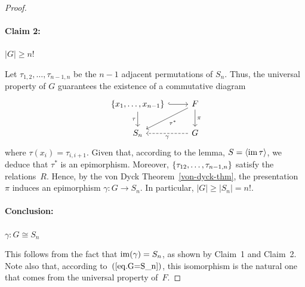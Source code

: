 \begin{proof}
\paragraph{Claim 2:}$|G|\ge n!$

Let $\tau_{1,2},\dots,\tau_{n-1,n}$ be the $n-1$ adjacent permutations of $S_n$. Thus, the universal property of $G$ guarantees the existence of a commutative diagram
\begin{equation}\label{eq.G=S_n}
    \begin{tikzcd}
        {\set{x_1,\dots,x_{n-1}}}
                \arrow[d,"\tau"']
                \arrow[r,hook]
            &F
                \arrow[ld,"\tau^*"]
                \arrow[d,"\pi"]\\
        S_n
            &G
                \arrow[l,dashed,"\gamma"]
    \end{tikzcd}
\end{equation}
where $\tau(x_i)=\tau_{i,i+1}$. Given that, according to the lemma, $S=\langle\operatorname{im}\tau\rangle$, we deduce that $\tau^*$ is an epimorphism. Moreover, $\{\tau_{12},\dots,\tau_{n-1,n}\}$ satisfy the relations~$R$. Hence, by the von Dyck Theorem~\ref{von-dyck-thm}, the presentation $\pi$ induces an epimorphism $\gamma\colon G\to S_n$. In particular, $|G|\ge|S_n|=n!$.

\paragraph{Conclusion:} $\gamma:G\cong S_n$

This follows from the fact that $\operatorname{im}(\gamma)=S_n$, as shown by Claim~1 and Claim~2. Note also that, according to~$(\ref{eq.G=S_n})$, this isomorphism is the natural one that comes from the universal property of~$F$.

\end{proof}


